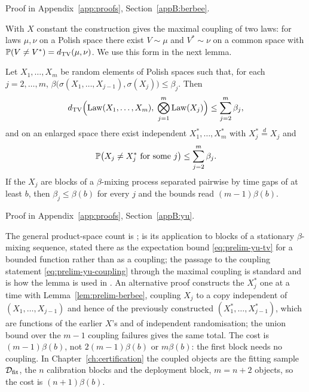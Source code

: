 \documentclass[../../../main.tex]{subfiles}
\begin{document}
Proof in Appendix~\ref{app:proofs}, Section~\ref{appB:berbee}.

With $X$ constant the construction gives the maximal coupling of two laws: for laws $\mu,\nu$ on a Polish space there exist $V\sim\mu$ and $V^*\sim\nu$ on a common space with $\mathbb{P}(V\ne V^*)=d_{\mathrm{TV}}(\mu,\nu)$. We use this form in the next lemma.

\begin{lemma}\label{lem:prelim-yu}
Let $X_1,\dots,X_m$ be random elements of Polish spaces such that, for each $j=2,\dots,m$, $\beta\big(\sigma(X_1,\dots,X_{j-1}),\sigma(X_j)\big)\le\beta_j$. Then
\begin{equation}\label{eq:prelim-yu-tv}
d_{\mathrm{TV}}\Big(\mathrm{Law}(X_1,\dots,X_m),\;\bigotimes_{j=1}^m\mathrm{Law}(X_j)\Big)\le\sum_{j=2}^m\beta_j,
\end{equation}
and on an enlarged space there exist independent $X_1^*,\dots,X_m^*$ with $X_j^*\overset{d}{=}X_j$ and
\begin{equation}\label{eq:prelim-yu-coupling}
\mathbb{P}\big(X_j\ne X_j^*\text{ for some }j\big)\le\sum_{j=2}^m\beta_j .
\end{equation}
If the $X_j$ are blocks of a $\beta$-mixing process separated pairwise by time gaps of at least $b$, then $\beta_j\le\beta(b)$ for every $j$ and the bounds read $(m-1)\beta(b)$.
\end{lemma}

Proof in Appendix~\ref{app:proofs}, Section~\ref{appB:yu}.

\begin{remark}\label{rem:prelim-yu-original}
The general product-space count is \cite[Cor.~2.7, p.~98]{yu1994}; \cite[Lemma~4.1, p.~102]{yu1994} is its application to blocks of a stationary $\beta$-mixing sequence, stated there as the expectation bound \eqref{eq:prelim-yu-tv} for a bounded function rather than as a coupling; the passage to the coupling statement \eqref{eq:prelim-yu-coupling} through the maximal coupling is standard and is how the lemma is used in \cite{oliveira2024}. An alternative proof constructs the $X_j^*$ one at a time with Lemma~\ref{lem:prelim-berbee}, coupling $X_j$ to a copy independent of $(X_1,\dots,X_{j-1})$ and hence of the previously constructed $(X_1^*,\dots,X_{j-1}^*)$, which are functions of the earlier $X$'s and of independent randomisation; the union bound over the $m-1$ coupling failures gives the same total. The cost is $(m-1)\beta(b)$, not $2(m-1)\beta(b)$ or $m\beta(b)$: the first block needs no coupling. In Chapter~\ref{ch:certification} the coupled objects are the fitting sample $\mathcal D_{\mathrm{fit}}$, the $n$ calibration blocks and the deployment block, $m=n+2$ objects, so the cost is $(n+1)\beta(b)$.
\end{remark}
\end{document}
